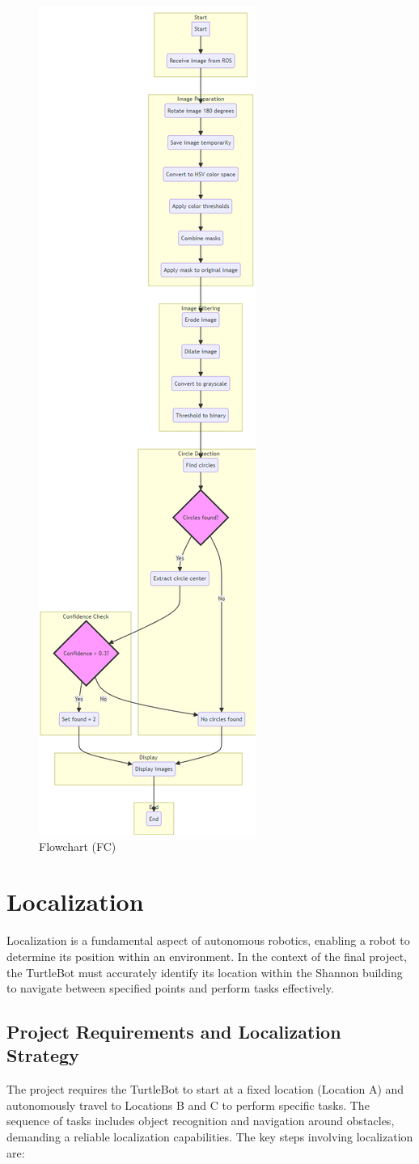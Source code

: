 \documentclass{article}
\begin{document}
	\begin{figure}[ht]
		\centering
		\includegraphics[width=.33\textwidth]{fig/fig9.png}
		\caption{Flowchart (FC)}
		\label{fig:combined}
	\end{figure}
	\clearpage
	\section{Localization}
	Localization is a fundamental aspect of autonomous robotics, enabling a robot to determine its position within an environment. In the context of the final project, the TurtleBot must accurately identify its location within the Shannon building to navigate between specified points and perform tasks effectively.
	
	\subsection{Project Requirements and Localization Strategy}
	The project requires the TurtleBot to start at a fixed location (Location A) and autonomously travel to Locations B and C to perform specific tasks. The sequence of tasks includes object recognition and navigation around obstacles, demanding a reliable localization capabilities. The key steps involving localization are:
	
\end{document}
